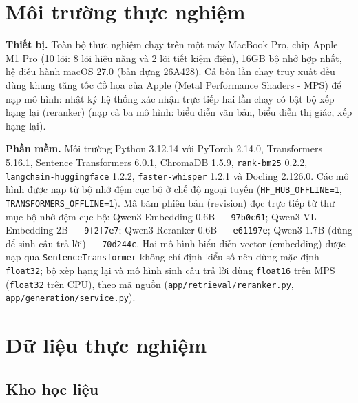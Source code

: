 
\section{Môi trường thực nghiệm}\label{sec:moi-truong}

\textbf{Thiết bị.} Toàn bộ thực nghiệm chạy trên một máy MacBook Pro, chip Apple M1 Pro (10 lõi: 8 lõi hiệu năng và 2 lõi tiết kiệm điện), 16GB bộ nhớ hợp nhất, hệ điều hành macOS 27.0 (bản dựng 26A428). Cả bốn lần chạy truy xuất đều dùng khung tăng tốc đồ họa của Apple (Metal Performance Shaders - MPS) để nạp mô hình: nhật ký hệ thống xác nhận trực tiếp hai lần chạy có bật bộ xếp hạng lại (reranker) (nạp cả ba mô hình: biểu diễn văn bản, biểu diễn thị giác, xếp hạng lại).

\bigbreak\noindent
\textbf{Phần mềm.} Môi trường Python 3.12.14 với PyTorch 2.14.0, Transformers 5.16.1, Sentence Transformers 6.0.1, ChromaDB 1.5.9, \texttt{rank-bm25} 0.2.2, \texttt{langchain-huggingface} 1.2.2, \texttt{faster-whisper} 1.2.1 và Docling 2.126.0. Các mô hình được nạp từ bộ nhớ đệm cục bộ ở chế độ ngoại tuyến (\texttt{HF\_HUB\_OFFLINE=1}, \texttt{TRANSFORMERS\_OFFLINE=1}). Mã băm phiên bản (revision) đọc trực tiếp từ thư mục bộ nhớ đệm cục bộ: Qwen3-Embedding-0.6B — \texttt{97b0c61}; Qwen3-VL-Embedding-2B — \texttt{9f2f7e7}; Qwen3-Reranker-0.6B — \texttt{e61197e}; Qwen3-1.7B (dùng để sinh câu trả lời) — \texttt{70d244c}. Hai mô hình biểu diễn vector (embedding) được nạp qua \texttt{SentenceTransformer} không chỉ định kiểu số nên dùng mặc định \texttt{float32}; bộ xếp hạng lại và mô hình sinh câu trả lời dùng \texttt{float16} trên MPS (\texttt{float32} trên CPU), theo mã nguồn (\texttt{app/retrieval/reranker.py}, \texttt{app/generation/service.py}).


\section{Dữ liệu thực nghiệm}\label{sec:du-lieu}

\subsection{Kho học liệu}

